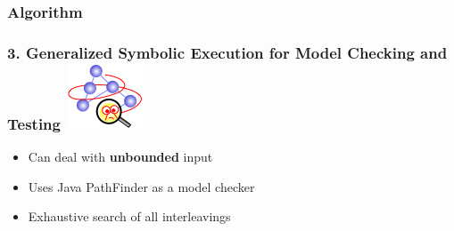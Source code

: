 \documentclass{beamer}
\begin{document}
	
	\begin{frame}[fragile]
		\frametitle{Algorithm}

		\lstI
	\end{frame}
	
	
	\begin{frame}
		\frametitle{3. Generalized Symbolic Execution for Model Checking and Testing \cite{base5} \includegraphics[scale=0.15]{jpf}}
		
		\begin{itemize}
			\item Can deal with \textbf{unbounded} input
			\item Uses Java PathFinder as a model checker
			\item Exhaustive search of all interleavings
		\end{itemize}
	\end{frame}
	
\end{document}
